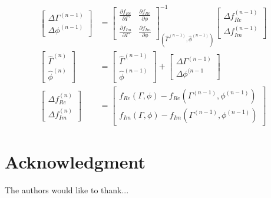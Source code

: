 \documentclass[draftcls,onecolumn]{IEEEtran}  %
\begin{document}
\begin{align}
 \begin{bmatrix} \Delta \Gamma^{(n-1)} \\ \Delta \phi^{(n-1)} \end{bmatrix} &=
 \begin{bmatrix}
        \frac{\partial f_{Re}}{\partial \Gamma}      &  \frac{\partial f_{Re}}{\partial \phi}  \\
        \frac{\partial f_{Im}}{\partial \Gamma}      &  \frac{\partial f_{Im}}{\partial \phi}  
    \end{bmatrix} ^{-1} _{(\hat{\Gamma}^{(n-1)} ,\hat{\phi}^{(n-1)})}
    \begin{bmatrix} \Delta f_{Re}^{(n-1)} \\ \Delta f_{Im}^{(n-1)} \end{bmatrix} \\
\begin{bmatrix} \hat{\Gamma}^{(n)} \\ \hat{\phi}^{(n)} \end{bmatrix}  &= 
\begin{bmatrix} \hat{\Gamma}^{(n-1)} \\ \hat{\phi}^{(n-1)} \end{bmatrix}  + \begin{bmatrix} \Delta \Gamma^{(n-1)} \\ \Delta \phi^{(n-1} \end{bmatrix} \\
\begin{bmatrix} \Delta f_{Re}^{(n)} \\ \Delta f_{Im}^{(n)} \end{bmatrix} &= 
\begin{bmatrix} f_{Re}(\Gamma, \phi) -  f_{Re}(\Gamma^{(n-1)}, \phi^{(n-1)})\\ f_{Im}(\Gamma, \phi) -  f_{Im}(\Gamma^{(n-1)}, \phi^{(n-1)})\end{bmatrix}
\label{Eq: LQS3}
\end{align}


\section*{Acknowledgment}


The authors would like to thank...


\ifCLASSOPTIONcaptionsoff
  \newpage
\fi
\end{document}
